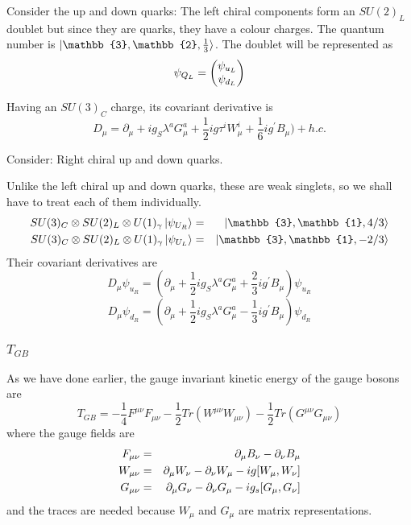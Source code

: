     Consider the up and down quarks:
    The left chiral components form an $SU(2)_L$ doublet but since they are quarks, they have a colour charges. The quantum number is $\ket{\mathbb{3}, \mathbb{2}, \frac{1}{3}}$. The doublet will be represented as
    \begin{equation}
      \psi_{Q_L} = \begin{pmatrix}{\psi_{u_L}}\\{\psi_{d_L}}\end{pmatrix}
    \end{equation}

    Having an $SU(3)_C$ charge, its covariant derivative is
    \begin{equation}
      D_\mu = \partial_\mu + i g_S \lambda^a G^a_\mu + \frac{1}{2} i g \tau^i W_\mu^i + \frac{1}{6} i g^\prime B_\mu) + h.c.
    \end{equation}

    Consider: Right chiral up and down quarks.

    Unlike the left chiral up and down quarks, these are weak singlets, so we shall have to treat each of them individually.
    \begin{eqnarray}
      SU(3)_C \otimes SU(2)_L \otimes U(1)_\gamma \ket{\psi_{U_R}} &=& \ket{\mathbb{3}, \mathbb{1}, 4/3} \nonext
      SU(3)_C \otimes SU(2)_L \otimes U(1)_\gamma \ket{\psi_{U_L}} &=& \ket{\mathbb{3}, \mathbb{1}, -2/3} \nonumber
    \end{eqnarray}
    Their covariant derivatives are
    \begin{equation}
      D_\mu \psi_{u_R} = \left(\partial_\mu + \frac{1}{2} i g_S \lambda^a G_\mu^a + \frac{2}{3} i g^\prime B_\mu\right) \psi_{u_R}
    \end{equation}
    \begin{equation}
      D_\mu \psi_{d_R} = \left(\partial_\mu + \frac{1}{2} i g_S \lambda^a G_\mu^a - \frac{1}{3} i g^\prime B_\mu\right) \psi_{d_R}
    \end{equation}

    \subsubsection{$T_{GB}$}
    As we have done earlier, the gauge invariant kinetic energy of the gauge bosons are
    \begin{equation}
      T_{GB} = -\frac{1}{4} F^{\mu\nu}F_{\mu\nu} - \frac{1}{2} Tr\left(W^{\mu\nu}W_{\mu\nu}\right) - \frac{1}{2} Tr\left(G^{\mu\nu}G_{\mu\nu}\right)
    \end{equation}
    where the gauge fields are
    \begin{eqnarray}
      F_{\mu\nu} &=& \partial_\mu B_\nu - \partial_\nu B_\mu \nonumber \\
      W_{\mu\nu} &=& \partial_\mu W_\nu - \partial_\nu W_\mu - ig [ W_\mu, W_\nu] \nonumber \\
      G_{\mu\nu} &=& \partial_\mu G_\nu - \partial_\nu G_\mu - ig_s [G_\mu, G_\nu] \nonumber
    \end{eqnarray}
    and the traces are needed because $W_\mu$ and $G_\mu$ are matrix representations.


